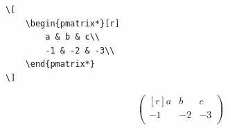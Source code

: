 \documentclass[handout,hyperref={colorlinks=true}]{beamer}
\theoremstyle{remark}
\newcommand{\vaihto}{\\ \vspace{10pt}}
\begin{document}
\begin{frame}[fragile]
    \begin{minipage}{4cm}
        \begin{scriptsize}
            \begin{Verbatim}[frame=single]
\[
    \begin{pmatrix*}[r]
        a & b & c\\
        -1 & -2 & -3\\
    \end{pmatrix*}
\]
            \end{Verbatim}
        \end{scriptsize}
    \end{minipage}
    \begin{minipage}{4cm}
        \[
            \begin{pmatrix*}[r]
                a & b & c\\
                -1 & -2 & -3\\
            \end{pmatrix*}
        \]
    \end{minipage}
\end{frame}
\end{document}
